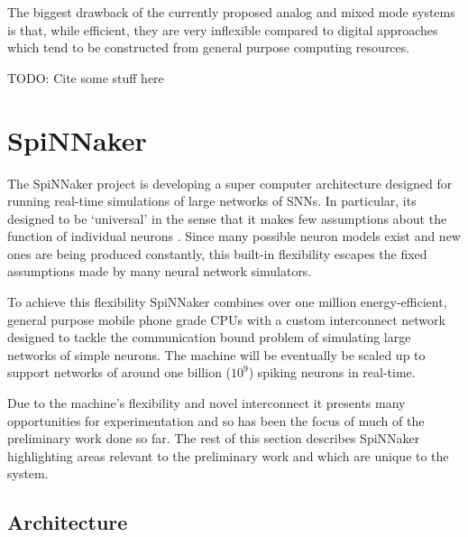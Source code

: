 			The biggest drawback of the currently proposed analog and mixed mode
			systems is that, while efficient, they are very inflexible compared to
			digital approaches which tend to be constructed from general purpose
			computing resources.
			
			TODO: Cite some stuff here
	
	
	\section{SpiNNaker}
		
		
		The SpiNNaker project is developing a super computer architecture designed
		for running real-time simulations of large networks of SNNs. In particular,
		its designed to be `universal' in the sense that it makes few assumptions
		about the function of individual neurons \cite{furber06}. Since many
		possible neuron models exist and new ones are being produced constantly,
		this built-in flexibility escapes the fixed assumptions made by many neural
		network simulators\cite{furber07}.
		
		To achieve this flexibility SpiNNaker combines over one million
		energy-efficient, general purpose mobile phone grade CPUs with a custom
		interconnect network designed to tackle the communication bound problem of
		simulating large networks of simple neurons. The machine will be eventually
		be scaled up to support networks of around one billion ($10^9$) spiking
		neurons in real-time.
		
		Due to the machine's flexibility and novel interconnect it presents many
		opportunities for experimentation and so has been the focus of much of the
		preliminary work done so far. The rest of this section describes SpiNNaker
		highlighting areas relevant to the preliminary work and which are unique to
		the system.
		
		\subsection{Architecture}
			
			

